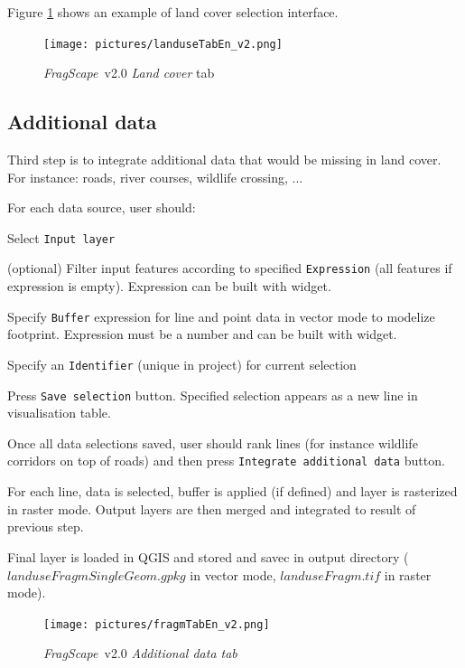 \documentclass[11pt]{article}
\newcommand{\source}[1]{\vspace*{-0.4cm}\caption*{\textit{Source: {#1}}}}
\newcommand{\tool}{\emph{FragScape}}
\let\tempone\itemize
\let\temptwo\enditemize
\renewenvironment{enumerate}{\tempone\addtolength{\itemsep}{-0.5\baselineskip}}{\temptwo}
\begin{document}
Figure \ref{fig:landuseTab} shows an example of land cover selection interface.

\begin{figure}[h!]
    \centering
    \texttt{[image: pictures/landuseTabEn\_v2.png]}
    \caption{\tool\ v2.0 \textit{Land cover} tab}
    \label{fig:landuseTab}
\end{figure}

\subsection{Additional data}

Third step is to integrate additional data that would be missing in land cover. For instance: roads, river courses, wildlife crossing, ...

For each data source, user should:
\begin{enumerate}
    \item Select \texttt{Input layer}
    \item (optional) Filter input features according to specified \texttt{Expression} (all features if expression is empty).  Expression can be built with  widget.
    \item Specify \texttt{Buffer} expression for line and point data in vector mode to modelize footprint. Expression must be a number and can be built with  widget.
    \item Specify an \texttt{Identifier} (unique in project) for current selection
    \item Press \texttt{Save selection} button. Specified selection appears as a new line in visualisation table.
\end{enumerate}

Once all data selections saved, user should rank lines (for instance wildlife corridors on top of roads) and then press \texttt{Integrate additional data} button.

For each line, data is selected, buffer is applied (if defined) and layer is rasterized in raster mode. Output layers are then merged and integrated to result of previous step.

Final layer is loaded in QGIS and stored and savec in output directory ($landuseFragmSingleGeom.gpkg$ in vector mode, $landuseFragm.tif$ in raster mode).

\bigskip

\begin{figure}[h!]
    \centering
    \texttt{[image: pictures/fragmTabEn\_v2.png]}
    \caption{\tool\ v2.0 \textit{Additional data tab}}
    \label{fig:fragmTab}
\end{figure}
\end{document}
